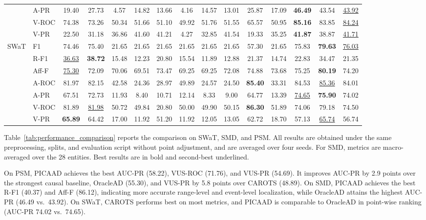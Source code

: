 \begin{table}[t]
{\begin{tabular}{ll|cccccccccc|ccc}
& A-PR   & 19.40 & 27.73 & 4.57 & 14.82 & 13.66 & 4.16 & 14.57 & 13.01 & 25.87 & 17.09 & \textbf{46.49} & 43.54 & \underline{43.92} \\
& V-ROC  & 74.38 & 73.26 & 50.34 & 51.66 & 51.10 & 49.92 & 51.76 & 51.55 & 65.57 & 50.95 & \textbf{85.16} & 83.85 & \underline{84.24} \\
& V-PR   & 22.50 & 31.18 & 36.86 & 41.60 & 41.21 & 4.27 & 32.85 & 41.54 & 19.33 & 35.25 & \textbf{41.87} & 38.87 & \underline{41.71} \\
\midrule
SWaT
& F1     & 74.46 & 75.40 & 21.65 & 21.65 & 21.65 & 21.65 & 21.65 & 21.65 & 57.30 & 21.65 & 75.83 & \textbf{79.63} & \underline{76.03} \\
& R-F1   & \underline{36.63} & \textbf{38.72} & 15.48 & 12.23 & 20.80 & 15.54 & 11.89 & 12.88 & 21.37 & 14.74 & 22.83 & 34.47 & 21.35 \\
& Aff-F  & \underline{75.30} & 72.09 & 70.06 & 69.51 & 73.47 & 69.25 & 69.25 & 72.08 & 74.88 & 73.68 & 75.25 & \textbf{80.19} & 74.20 \\
& A-ROC  & 81.97 & 82.15 & 42.58 & 24.36 & 28.97 & 49.89 & 24.57 & 24.50 & \textbf{85.40} & 33.31 & 84.53 & \underline{85.36} & 84.01 \\
& A-PR   & 67.51 & 72.73 & 11.93 & 8.40 & 10.71 & 12.14 & 8.33 & 9.00 & 64.77 & 13.39 & \underline{74.65} & \textbf{75.90} & 74.02 \\
& V-ROC  & 81.89 & \underline{81.98} & 50.72 & 49.84 & 20.80 & 50.00 & 49.90 & 50.15 & \textbf{86.30} & 51.89 & 74.06 & 79.18 & 74.50 \\
& V-PR   & \textbf{65.89} & 64.42 & 17.00 & 11.92 & 51.20 & 11.92 & 12.05 & 13.05 & 62.72 & 18.70 & 57.13 & \underline{65.74} & 56.74 \\
\bottomrule
\end{tabular}%
}
\end{table}

Table~\ref{tab:performance_comparison} reports the comparison on SWaT, SMD, and
PSM. All results are obtained under the same preprocessing, splits, and
evaluation script without point adjustment, and are averaged over four seeds.
For SMD, metrics are macro-averaged over the 28 entities. Best results are in
bold and second-best underlined.

On PSM, PICAAD achieves the best AUC-PR (58.22), VUS-ROC (71.76), and VUS-PR
(54.69). It improves AUC-PR by 2.9 points over the strongest causal baseline,
OracleAD (55.30), and VUS-PR by 5.8 points over CAROTS (48.89). On SMD, PICAAD
achieves the best R-F1 (40.37) and Aff-F (86.12), indicating more accurate
range-level and event-level localization, while OracleAD attains the highest
AUC-PR (46.49 vs.\ 43.92). On SWaT, CAROTS performs best on most metrics, and
PICAAD is comparable to OracleAD in point-wise ranking (AUC-PR 74.02 vs.\ 74.65).

